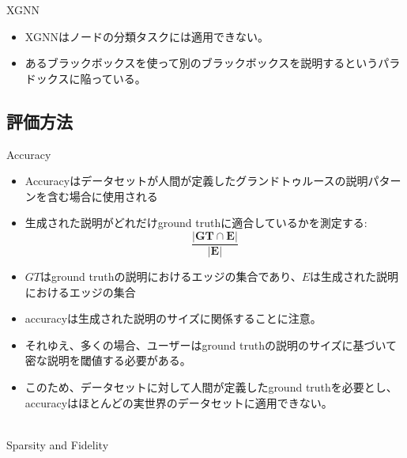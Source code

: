 \documentclass[a4paper,10pt]{ltjsarticle}
\newcommand{\1}{\mbox{1}\hspace{-0.25em}\mbox{l}}
\theoremstyle{definition}
\begin{document}
    XGNN \ \cite{yuan2020xgnn}
    \begin{itemize}
        \item XGNNはノードの分類タスクには適用できない。
        \item あるブラックボックスを使って別のブラックボックスを説明するというパラドックスに陥っている。
    \end{itemize}

    \subsection{評価方法}
    Accuracy
    \begin{itemize}
        \item Accuracyはデータセットが人間が定義したグランドトゥルースの説明パターンを含む場合に使用される
        \cite{ying2019gnnexplainer, luo2020parameterized, yuan2020xgnn, vu2020pgm}
        \item 生成された説明がどれだけground truthに適合しているかを測定する:
        \begin{equation}
            \frac{|\mathbf{G} \mathbf{T} \cap \mathbf{E}|}{|\mathbf{E}|}
        \end{equation}
        \item $GT$はground truthの説明におけるエッジの集合であり、$E$は生成された説明におけるエッジの集合
        \item accuracyは生成された説明のサイズに関係することに注意。
        \item それゆえ、多くの場合、ユーザーはground truthの説明のサイズに基づいて密な説明を閾値する必要がある。
        \item このため、データセットに対して人間が定義したground truthを必要とし、accuracyはほとんどの実世界のデータセットに適用できない。
    \end{itemize}
    \\
    Sparsity and Fidelity
\end{document}
